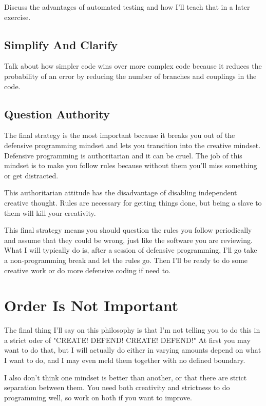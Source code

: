 Discuss the advantages of automated testing and how I'll teach that in a later exercise.

\subsection{Simplify And Clarify}

Talk about how simpler code wins over more complex code because it reduces the probability of
an error by reducing the number of branches and couplings in the code.

\subsection{Question Authority}

The final strategy is the most important because it breaks you out of the
defensive programming mindset and lets you transition into the creative
mindset.  Defensive programming is authoritarian and it can be cruel.  The
job of this mindset is to make you follow rules because without them you'll
miss something or get distracted.

This authoritarian attitude has the disadvantage of disabling independent 
creative thought.  Rules are necessary for getting things done, but being
a slave to them will kill your creativity.

This final strategy means you should question the rules you follow periodically
and assume that they could be wrong, just like the software you are reviewing.
What I will typically do is, after a session of defensive programming, I'll go
take a non-programming break and let the rules go.  Then I'll be ready to do
some creative work or do more defensive coding if need to.

\section{Order Is Not Important}

The final thing I'll say on this philosophy is that I'm not telling you to do this in
a strict oder of "CREATE! DEFEND! CREATE! DEFEND!"  At first you may want to do that,
but I will actually do either in varying amounts depend on what I want to do, and I may
even meld them together with no defined boundary.

I also don't think one mindset is better than another, or that there are strict separation
between them.  You need both creativity and strictness to do programming well, so work
on both if you want to improve.


